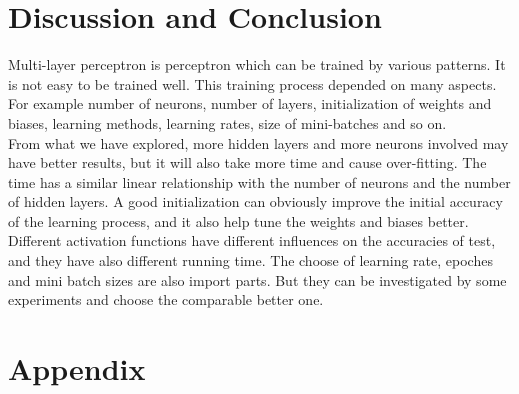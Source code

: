 \documentclass[12pt,a4paper]{article}
\begin{document}
\section{Discussion and Conclusion}
Multi-layer perceptron is perceptron which can be trained by various patterns. It is not easy to be trained well. This training process depended on many aspects. For example number of neurons, number of layers, initialization of weights and biases, learning methods, learning rates, size of mini-batches and so on. \\

From what we have explored, more hidden layers and more neurons involved may have better results, but it will also take more time and cause over-fitting. The time has a similar linear relationship with the number of neurons and the number of hidden layers. A good initialization can obviously improve the initial accuracy of the learning process, and it also help tune the weights and biases better. Different activation functions have different influences on the accuracies of test, and they have also different running time. The choose of learning rate, epoches and mini batch sizes are also import parts. But they can be investigated by some experiments and choose the comparable better one.

\newpage
\section{Appendix}
\end{document}
